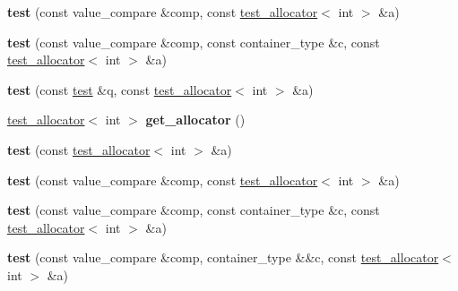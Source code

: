 \begin{DoxyCompactItemize}
\item 
\mbox{\label{structtest_a1c50367305d6ff2edfe671cbe4e3a571}} 
{\bfseries test} (const value\+\_\+compare \&comp, const \mbox{\hyperlink{classtest__allocator}{test\+\_\+allocator}}$<$ int $>$ \&a)
\item 
\mbox{\label{structtest_a4414ff2f3f26f8ccf0297f2766982745}} 
{\bfseries test} (const value\+\_\+compare \&comp, const container\+\_\+type \&c, const \mbox{\hyperlink{classtest__allocator}{test\+\_\+allocator}}$<$ int $>$ \&a)
\item 
\mbox{\label{structtest_ac3f051ea7cb5ead8f43e12de8bfe58b9}} 
{\bfseries test} (const \mbox{\hyperlink{structtest}{test}} \&q, const \mbox{\hyperlink{classtest__allocator}{test\+\_\+allocator}}$<$ int $>$ \&a)
\item 
\mbox{\label{structtest_a2c31ee85ae81b89114b3f14daca091cb}} 
\mbox{\hyperlink{classtest__allocator}{test\+\_\+allocator}}$<$ int $>$ {\bfseries get\+\_\+allocator} ()
\item 
\mbox{\label{structtest_a6cbe38c39948288cef13b3f05a759671}} 
{\bfseries test} (const \mbox{\hyperlink{classtest__allocator}{test\+\_\+allocator}}$<$ int $>$ \&a)
\item 
\mbox{\label{structtest_a1c50367305d6ff2edfe671cbe4e3a571}} 
{\bfseries test} (const value\+\_\+compare \&comp, const \mbox{\hyperlink{classtest__allocator}{test\+\_\+allocator}}$<$ int $>$ \&a)
\item 
\mbox{\label{structtest_a4414ff2f3f26f8ccf0297f2766982745}} 
{\bfseries test} (const value\+\_\+compare \&comp, const container\+\_\+type \&c, const \mbox{\hyperlink{classtest__allocator}{test\+\_\+allocator}}$<$ int $>$ \&a)
\item 
\mbox{\label{structtest_a4188cbbc61133cdd55f87cfa2ef5b378}} 
{\bfseries test} (const value\+\_\+compare \&comp, container\+\_\+type \&\&c, const \mbox{\hyperlink{classtest__allocator}{test\+\_\+allocator}}$<$ int $>$ \&a)
\item 
\mbox{\label{structtest_a36be340a64fd1af58c3c87c6b2448a38}} 

\end{DoxyCompactItemize}
